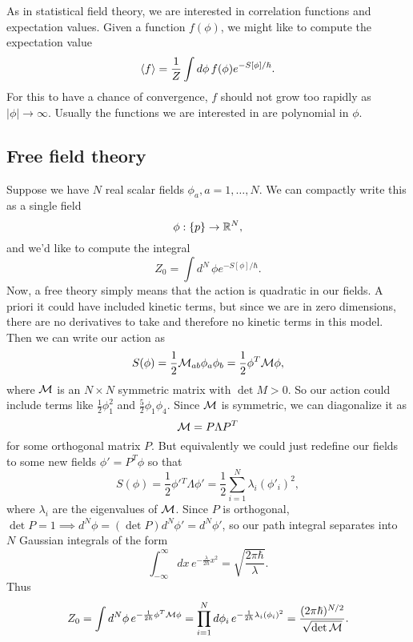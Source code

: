 As in statistical field theory, we are interested in correlation functions and expectation values. Given a function $f(\phi)$, we might like to compute the expectation value
\begin{equation}
    \left< f \right>=\frac{1}{Z} \int d\phi \, f(\phi)e^{-S[\phi]/\hbar}.
\end{equation}
For this to have a chance of convergence, $f$ should not grow too rapidly as $|\phi| \to \infty$. Usually the functions we are interested in are polynomial in $\phi$.

\subsection*{Free field theory}
Suppose we have $N$ real scalar fields $\phi_a, a=1,\ldots, N$. We can compactly write this as a single field
\begin{equation}
    \phi: \{p\}\to \mathbb{R}^N,
\end{equation}
and we'd like to compute the integral
\begin{equation}
    Z_0 = \int d^N\, \phi e^{-S[\phi]/\hbar}.
\end{equation}
Now, a free theory simply means that the action is quadratic in our fields. A priori it could have included kinetic terms, but since we are in zero dimensions, there are no derivatives to take and therefore no kinetic terms in this model. Then we can write our action as
\begin{equation}
    S(\phi)=\frac{1}{2} \mathcal{M}_{ab} \phi_a \phi_b =\frac{1}{2} \phi^T \mathcal{M} \phi,
\end{equation}
where $\mathcal{M}$ is an $N\times N$ symmetric matrix with $\det M > 0$. So our action could include terms like $\frac{1}{2}\phi_1^2$ and $\frac{5}{2} \phi_1 \phi_4$. Since $\mathcal{M}$ is symmetric, we can diagonalize it as
\begin{equation*}
    \mathcal{M}=P\Lambda P^T
\end{equation*}
for some orthogonal matrix $P$. But equivalently we could just redefine our fields to some new fields $\phi'= P^T  \phi$ so that 
\begin{equation*}
    S(\phi)= \frac{1}{2} \phi'{}^T \Lambda \phi'= \frac{1}{2} \sum_{i=1}^N \lambda_i (\phi'_i)^2,
\end{equation*}
where $\lambda_i$ are the eigenvalues of $\mathcal{M}$. Since $P$ is orthogonal, $\det P = 1 \implies d^N \phi=(\det P)d^N \phi' = d^N \phi'$, so our path integral separates into $N$ Gaussian integrals of the form
\begin{equation}
    \int_{-\infty}^\infty dx\, e^{-\frac{\lambda}{2\hbar}x^2}=\sqrt{\frac{2\pi \hbar}{\lambda}}.
\end{equation}
Thus
\begin{equation}
    Z_0 = \int d^N \phi \, e^{-\frac{1}{2\hbar}\phi^T \mathcal{M} \phi}= \prod_{i=1}^N d \phi_i \, e^{-\frac{1}{2\hbar} \lambda_i (\phi_i)^2} = \frac{(2\pi \hbar)^{N/2}}{\sqrt{\det \mathcal{M}}}.
\end{equation}

